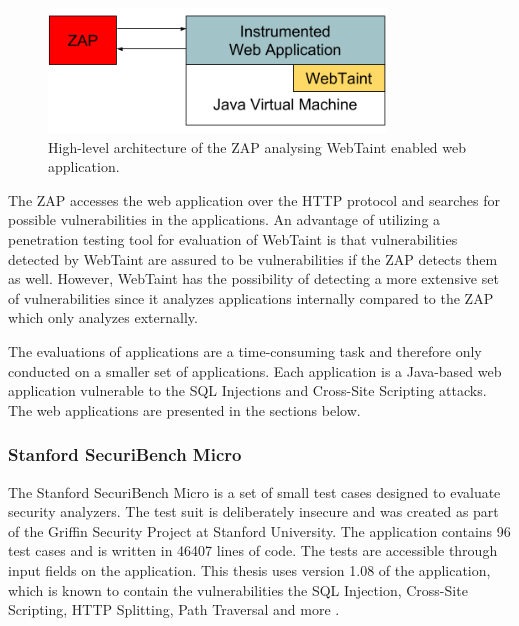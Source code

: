 \begin{figure}[H]
    \centering
    \includegraphics[width=0.8\textwidth]{images/ZAPArchitecture.png}
    \caption{High-level architecture of the ZAP analysing WebTaint enabled web application.}
    \label{fig:ZAP}
\end{figure}

The ZAP accesses the web application over the HTTP protocol and searches for possible vulnerabilities in the applications. An advantage of utilizing a penetration testing tool for evaluation of WebTaint is that vulnerabilities detected by WebTaint are assured to be vulnerabilities if the ZAP detects them as well. However, WebTaint has the possibility of detecting a more extensive set of vulnerabilities since it analyzes applications internally compared to the ZAP which only analyzes externally.

The evaluations of applications are a time-consuming task and therefore only conducted on a smaller set of applications. Each application is a Java-based web application vulnerable to the SQL Injections and Cross-Site Scripting attacks. The web applications are presented in the sections below.



\subsubsection{Stanford SecuriBench Micro}
The Stanford SecuriBench Micro is a set of small test cases designed to evaluate security analyzers. The test suit is deliberately insecure and was created as part of the Griffin Security Project \parencite{griffin} at Stanford University. The application contains 96 test cases and is written in 46407 lines of code. The tests are accessible through input fields on the application. This thesis uses version 1.08 of the application, which is known to contain the vulnerabilities the SQL Injection, Cross-Site Scripting, HTTP Splitting, Path Traversal and more \parencite{securiBenchMicro, microfaq}. 



